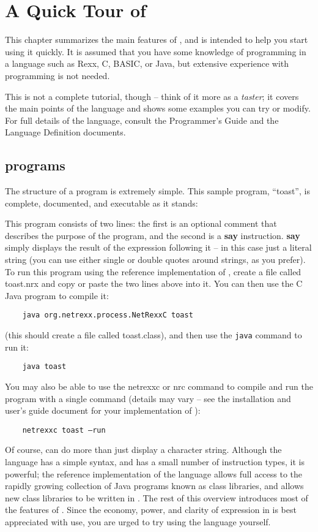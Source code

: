 \chapter{A Quick Tour of \nr{}}
This chapter summarizes the main features of \nr{}, and is intended
to help you start using it quickly. It is assumed that you have some
knowledge of programming in a language such as Rexx, C, BASIC, or
Java, but extensive experience with programming is not needed.

This is not a complete tutorial, though – think of it more as a
\emph{taster}; it covers the main points of the language and shows some
examples you can try or modify. For full details of the language,
consult the \nr{} Programmer's Guide and the \nr{} Language
Definition documents.

\section{\nr{} programs}
The structure of a \nr{} program is extremely simple. This sample
program, “toast”, is complete, documented, and executable as it
stands:

This program consists of two lines: the first is an optional comment that describes the purpose of the program, and the second is a \textbf{say} instruction. \textbf{say} simply displays the result of the expression following it – in this case just a literal string (you can use either single or double quotes around strings, as you prefer).
To run this program using the reference implementation of \nr{},
create a file called toast.nrx and copy or paste the two lines above
into it. You can then use the \nr{}C Java program to compile it:
\begin{verbatim}
    java org.netrexx.process.NetRexxC toast
\end{verbatim}
(this should create a file called toast.class), and then use
the \texttt{java} command to run it:
\begin{verbatim}
    java toast
\end{verbatim}
You may also be able to use the netrexxc or nrc command to compile and
run the program with a single command (details may vary – see the
installation and user’s guide document for your implementation of
\nr{}):
\begin{verbatim}
    netrexxc toast –run
\end{verbatim}
Of course, \nr{} can do more than just display a character string. Although the language has a simple syntax, and has a small number of instruction types, it is powerful; the reference implementation of the language allows full access to the rapidly growing collection of Java programs known as class libraries, and allows new class libraries to be written in \nr{}.
The rest of this overview introduces most of the features of \nr{}. Since the economy, power, and clarity of expression in \nr{} is best appreciated with use, you are urged to try using the language yourself.
